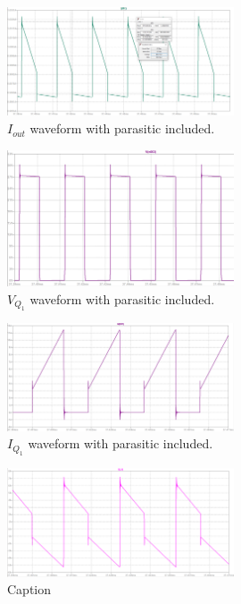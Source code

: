 \begin{figure}[H]
    \centering
    \includegraphics[width=0.6\textwidth]{Figures/iot-avg-ripple.png}
    \caption{$I_{out}$ waveform with parasitic included.}
    \label{fig:i_out}
\end{figure}
\begin{figure}[H]
    \centering
    \includegraphics[width=0.6\textwidth]{Figures/mosfet-voltage.png}
    \caption{$V_{Q_1}$ waveform with parasitic included.}
    \label{fig:v_sw}
\end{figure}
\begin{figure}[H]
    \centering
    \includegraphics[width=0.6\textwidth]{Figures/mosfet-current.png}
    \caption{$I_{Q_1}$ waveform with parasitic included.}
    \label{fig:i_sw}
\end{figure}
\begin{figure}[H]
    \centering
    \includegraphics[width=0.6\textwidth]{Figures/trans_prim_curr.png}
    \caption{Caption}
    \label{fig:lm}
\end{figure}
